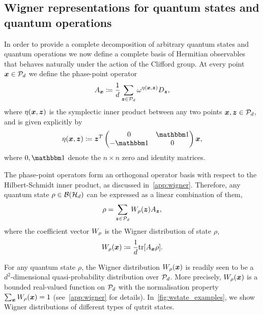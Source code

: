 \documentclass[pra,
aps,
twocolumn,
superscriptaddress,
groupedaddress,
nofootinbib,
reprint
]{revtex4-1}
\begin{document}
\subsection{Wigner representations for quantum states and quantum operations}\label{sec:wigner}

In order to provide a complete decomposition of arbitrary quantum states and quantum operations we now define a complete basis of Hermitian observables that behaves naturally under the action of the Clifford group. At every point $\x \in \P_d$ we define the phase-point operator
\begin{equation}\label{eq:ax}
	A_{\bmx} \coloneqq \frac{1}{d} \sum_{\bmz \in \cal{P}_d} \omega^{\eta(\bmx, \bmz)} D_{\bmz}, 
\end{equation}
where $\eta(\bmx, \bmz)$ is the symplectic inner product between any two points $\x,\z \in \P_d$, and is given explicitly by
\begin{equation}
	\eta(\bmx, \bmz) \coloneqq \bmz^T \begin{pmatrix}
		0  & \id \\ %
		-\id & 0 \\ %
	\end{pmatrix} \bmx,
\end{equation}
where $0, \id$ denote the $n\times n$ zero and identity matrices.

The phase-point operators form an orthogonal operator basis with respect to the Hilbert-Schmidt inner product, as discussed in~\cref{app:wigner}.
Therefore, any quantum state $\rho \in \cal{B}(\cal{H}_d)$ can be expressed as a linear combination of them,
\begin{equation}
    \rho = \sum_{\bmz \in \cal{P}_d} \W[\bmz]{\rho} A_{\bmz},
\end{equation}
where the coefficient vector $\W{\rho}$ is the Wigner distribution of state $\rho$,
\begin{equation}\label{eq:wstate}
    \W[\bmx]{\rho} \coloneqq \frac{1}{d}\tr[A_{\bmx} \rho].
\end{equation}

For any quantum state $\rho$, the Wigner distribution $W_\rho(\bmx)$ is readily seen to be a $d^2$-dimensional quasi-probability distribution over $\cal{P}_d$. More precisely, $W_\rho(\x)$ is a bounded real-valued function on $\P_d$ with the normalisation property $\sum_{\x} W_\rho(\bmx) = 1$ (see~\cref{app:wigner} for details).  In~\cref{fig:wstate_examples}, we show Wigner distributions of different types of qutrit states.
\end{document}
